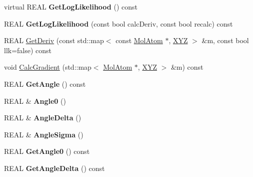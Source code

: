 \begin{DoxyCompactItemize}
virtual R\+E\+AL {\bfseries Get\+Log\+Likelihood} () const
\item 
\mbox{\label{class_obj_cryst_1_1_mol_bond_angle_ae07a2c2e0a071e279abc1adf25fb92c1}} 
R\+E\+AL {\bfseries Get\+Log\+Likelihood} (const bool calc\+Deriv, const bool recalc) const
\item 
R\+E\+AL \mbox{\hyperlink{class_obj_cryst_1_1_mol_bond_angle_a080d1e80978fba486ecdfc894137c3e6}{Get\+Deriv}} (const std\+::map$<$ const \mbox{\hyperlink{class_obj_cryst_1_1_mol_atom}{Mol\+Atom}} $\ast$, \mbox{\hyperlink{struct_obj_cryst_1_1_x_y_z}{X\+YZ}} $>$ \&m, const bool llk=false) const
\item 
void \mbox{\hyperlink{class_obj_cryst_1_1_mol_bond_angle_a289950992c7e264f7d2a307db367eaa1}{Calc\+Gradient}} (std\+::map$<$ \mbox{\hyperlink{class_obj_cryst_1_1_mol_atom}{Mol\+Atom}} $\ast$, \mbox{\hyperlink{struct_obj_cryst_1_1_x_y_z}{X\+YZ}} $>$ \&m) const
\item 
\mbox{\label{class_obj_cryst_1_1_mol_bond_angle_a20175f4976038a9d8d93f267eea662ed}} 
R\+E\+AL {\bfseries Get\+Angle} () const
\item 
\mbox{\label{class_obj_cryst_1_1_mol_bond_angle_a5e07d000ae4148c62e0c55c531d1564a}} 
R\+E\+AL \& {\bfseries Angle0} ()
\item 
\mbox{\label{class_obj_cryst_1_1_mol_bond_angle_aa076f337bcb16de6fc922f8d13e92b88}} 
R\+E\+AL \& {\bfseries Angle\+Delta} ()
\item 
\mbox{\label{class_obj_cryst_1_1_mol_bond_angle_a207b1d3093266c3f399c7ec56b3c18f3}} 
R\+E\+AL \& {\bfseries Angle\+Sigma} ()
\item 
\mbox{\label{class_obj_cryst_1_1_mol_bond_angle_abf19d1f1ba5b5cfde029f9537f96a2ab}} 
R\+E\+AL {\bfseries Get\+Angle0} () const
\item 
\mbox{\label{class_obj_cryst_1_1_mol_bond_angle_aee08dbc2377cdf782ceb32507afdc58d}} 
R\+E\+AL {\bfseries Get\+Angle\+Delta} () const
\item 
\mbox{\label{class_obj_cryst_1_1_mol_bond_angle_ab28f075773550d02fe2f13a5f899a26c}} 

\end{DoxyCompactItemize}
